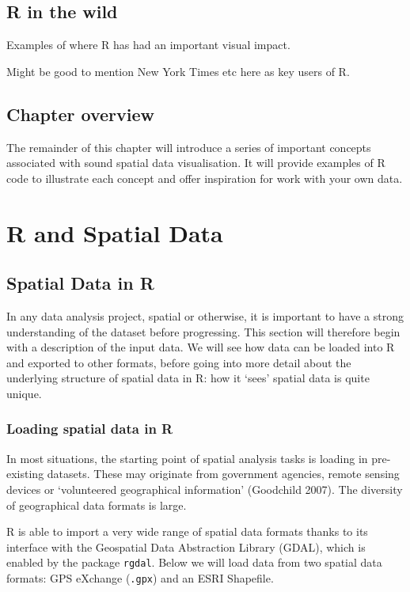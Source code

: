 \documentclass[]{article}
\begin{document}
\subsection{R in the wild}

Examples of where R has had an important visual impact.

Might be good to mention New York Times etc here as key users of R.

\subsection{Chapter overview}

The remainder of this chapter will introduce a series of important
concepts associated with sound spatial data visualisation. It will
provide examples of R code to illustrate each concept and offer
inspiration for work with your own data.

\section{R and Spatial Data}

\subsection{Spatial Data in R}

In any data analysis project, spatial or otherwise, it is important to
have a strong understanding of the dataset before progressing. This
section will therefore begin with a description of the input data. We
will see how data can be loaded into R and exported to other formats,
before going into more detail about the underlying structure of spatial
data in R: how it `sees' spatial data is quite unique.

\subsubsection{Loading spatial data in R}

In most situations, the starting point of spatial analysis tasks is
loading in pre-existing datasets. These may originate from government
agencies, remote sensing devices or `volunteered geographical
information' (Goodchild 2007). The diversity of geographical data
formats is large.

R is able to import a very wide range of spatial data formats thanks to
its interface with the Geospatial Data Abstraction Library (GDAL), which
is enabled by the package \texttt{rgdal}. Below we will load data from
two spatial data formats: GPS eXchange (\texttt{.gpx}) and an ESRI
Shapefile.
\end{document}
